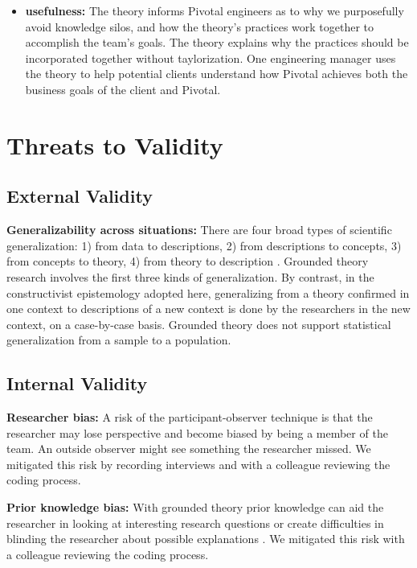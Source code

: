 \begin{table}[]
\begin{itemize}
\item
\textbf{usefulness:}  The theory informs Pivotal engineers as to why we purposefully avoid knowledge silos, and how the theory's practices work together to accomplish the team's goals.  The theory explains why the practices should be incorporated together without taylorization. One engineering manager uses the theory to help potential clients understand how Pivotal  achieves both the business goals of the client and Pivotal.

\end{itemize}

\section{Threats to Validity}

\subsection{External Validity}

\textbf{Generalizability across situations:} There are four broad types of scientific generalization: 1) from data to descriptions, 2) from descriptions to concepts, 3) from concepts to theory, 4) from theory to description \cite{Lee2003generalizing}. Grounded theory research involves the first three kinds of generalization. By contrast, in the constructivist epistemology adopted here, generalizing from a theory confirmed in one context to descriptions of a new context is done by the researchers in the new context, on a case-by-case basis. Grounded theory does not support statistical generalization from a sample to a population.

\subsection{Internal Validity}
\textbf{Researcher bias:} A risk of the participant-observer technique is that the researcher may lose perspective and become biased by being a member of the team. An outside observer might see something the researcher missed. We mitigated this risk by recording interviews and with a colleague reviewing the coding process.

\textbf{Prior knowledge bias:} With grounded theory prior knowledge can aid the researcher in looking at interesting research questions or create difficulties in blinding the researcher about possible explanations \cite{GlaserIssues}. We mitigated this risk with a colleague reviewing the coding process. 

\end{table}
